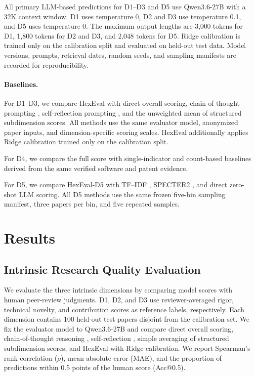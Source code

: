 \documentclass[letterpaper]{article} %
\begin{document}
All primary LLM-based predictions for D1--D3 and D5 use Qwen3.6-27B \cite{qwen2026qwen36} with a 32K context window. D1 uses temperature 0, D2 and D3 use temperature 0.1, and D5 uses temperature 0. The maximum output lengths are 3,000 tokens for D1, 1,800 tokens for D2 and D3, and 2,048 tokens for D5. Ridge calibration is trained only on the calibration split and evaluated on held-out test data. Model versions, prompts, retrieval dates, random seeds, and sampling manifests are recorded for reproducibility.

\paragraph{Baselines.}
For D1--D3, we compare HexEval with direct overall scoring, chain-of-thought prompting \cite{wei2022chain}, 
self-reflection prompting \cite{madaan2023selfrefine}, and the unweighted mean of structured subdimension 
scores. All methods use the same evaluator model, anonymized paper inputs, and dimension-specific scoring 
scales. HexEval additionally applies Ridge calibration trained only on the calibration split. 

For D4, we compare the full score with single-indicator and count-based baselines derived from the same verified software and patent evidence.

For D5, we compare HexEval-D5 with TF--IDF \cite{salton1988term}, SPECTER2 \cite{singh2023scirepeval}, and direct zero-shot LLM scoring. All D5 methods use the same frozen five-bin sampling manifest, three papers per bin, and five repeated samples.

\section{Results}
\subsection{Intrinsic Research Quality Evaluation}
\label{sec:intrinsic_evaluation}

We evaluate the three intrinsic dimensions by comparing model scores with human peer-review judgments. D1, D2, and D3 use reviewer-averaged rigor, technical novelty, and contribution scores as reference labels, 
respectively. Each dimension contains 100 held-out test papers disjoint from the calibration set. We fix the evaluator model to Qwen3.6-27B and compare direct overall scoring, chain-of-thought reasoning 
\cite{wei2022chain}, self-reflection \cite{madaan2023selfrefine}, simple averaging of structured subdimension scores, and HexEval with Ridge calibration. We report Spearman's rank correlation ($\rho$), mean absolute error (MAE), and the proportion of predictions within 0.5 points of the
human score (Acc@0.5).
\end{document}
